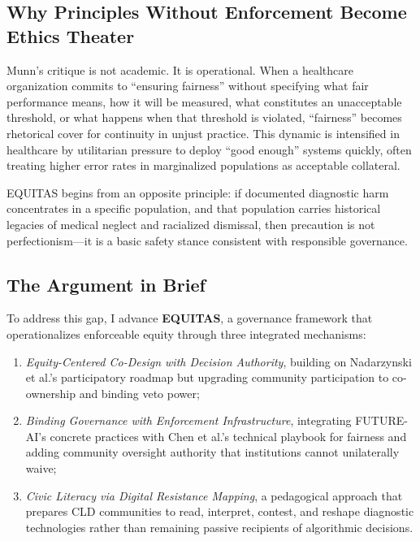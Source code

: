 \documentclass[12pt,a4paper]{article}
\begin{document}
\subsection{Why Principles Without Enforcement Become Ethics Theater}

Munn's critique is not academic. It is operational. When a healthcare organization commits to ``ensuring fairness'' without specifying what fair performance means, how it will be measured, what constitutes an unacceptable threshold, or what happens when that threshold is violated, ``fairness'' becomes rhetorical cover for continuity in unjust practice.\cite{munn_idai700} This dynamic is intensified in healthcare by utilitarian pressure to deploy ``good enough'' systems quickly, often treating higher error rates in marginalized populations as acceptable collateral.\cite{munn_idai700}

EQUITAS begins from an opposite principle: if documented diagnostic harm concentrates in a specific population, and that population carries historical legacies of medical neglect and racialized dismissal, then precaution is not perfectionism—it is a basic safety stance consistent with responsible governance.\cite{garcia_ed415}

\subsection{The Argument in Brief}

To address this gap, I advance \textbf{EQUITAS}, a governance framework that operationalizes enforceable equity through three integrated mechanisms:

\begin{enumerate}
    \setlength\itemsep{0.1em}
    \item \textit{Equity-Centered Co-Design with Decision Authority}, building on Nadarzynski et al.'s participatory roadmap but upgrading community participation to co-ownership and binding veto power;\cite{nadarzynski2024}
    
    \item \textit{Binding Governance with Enforcement Infrastructure}, integrating FUTURE-AI's concrete practices \cite{lekadir2025} with Chen et al.'s technical playbook for fairness \cite{chen2023} and adding community oversight authority that institutions cannot unilaterally waive;
    
    \item \textit{Civic Literacy via Digital Resistance Mapping}, a pedagogical approach that prepares CLD communities to read, interpret, contest, and reshape diagnostic technologies rather than remaining passive recipients of algorithmic decisions.\cite{garcia_ed415}
\end{enumerate}
\end{document}
